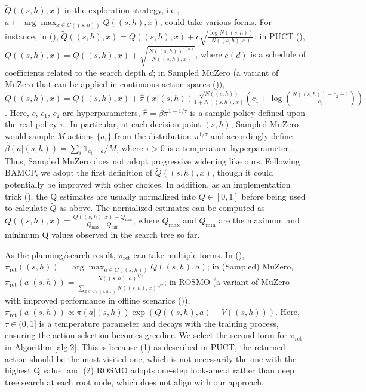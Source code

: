 $\tilde{Q}((s, h), x)$ in the exploration strategy, i.e., $a \leftarrow \arg \max_{x \in C((s, h))} \tilde{Q}((s, h), x)$, could take various forms. For instance, in (\cite{DBLP:conf/lion/CouetouxHSTB11, DBLP:journals/jair/GuezSD13, DBLP:conf/aaai/LeeJKK20}), $\tilde{Q}((s, h), x) = Q((s, h), x) + c \sqrt{\frac{\log N((s, h))}{N((s, h), x)}}$; in PUCT (\cite{DBLP:conf/pkdd/AugerCT13}), $\tilde{Q}((s, h), x) = Q((s, h), x) + \sqrt{\frac{N((s, h))^{e(d)}}{N((s, h), x)}}$, where $e(d)$ is a schedule of coefficients related to the search depth $d$; in Sampled MuZero (a variant of MuZero that can be applied in continuous action spaces (\cite{DBLP:conf/icml/HubertSABSS21})), $\tilde{Q}((s, h), x) = Q((s, h), x) + \hat{\pi}(x|(s, h)) \frac{\sqrt{N((s, h))}}{1+N((s, h), x)} \left(c_1 + \log \left(\frac{N((s,h))+c_2+1}{c_2}\right)\right)$.
Here, $c$, $c_1$, $c_2$ are hyperparameters, $\hat{\pi} = \hat{\beta} \pi^{1 - 1/\tau}$ is a sample policy defined upon the real policy $\pi$. In particular, at each decision point $(s, h)$, Sampled MuZero would sample $M$ actions $\{a_i\}$ from the distribution $\pi^{1/\tau}$ and accordingly define $\hat{\beta}(a|(s, h)) = \sum_{i} \mathds{1}_{a_i = a} / M$, where $\tau > 0$ is a temperature hyperparameter. Thus, Sampled MuZero does not adopt progressive widening like ours. Following BAMCP, we adopt the first definition of $\tilde{Q}((s, h), x)$, though it could potentially be improved with other choices. In addition, as an implementation trick (\cite{DBLP:conf/iclr/HamrickFBGVWABV21}), the Q estimates are usually normalized into $\bar{Q} \in [0, 1]$ before being used to calculate $\tilde{Q}$ as above. The normalized estimates can be computed as $\bar{Q}((s, h), x) = \frac{Q((s, h), x) - Q_{\text{min}}}{Q_{\text{max}} - Q_{\text{min}}}$, where $Q_{\text{max}}$ and $Q_{\text{min}}$ are the maximum and minimum Q values observed in the search tree so far.

As the planning/search result, $\pi_{\text{ret}}$ can take multiple forms. In (\cite{DBLP:journals/jair/GuezSD13, DBLP:conf/aips/SunbergK18, DBLP:conf/aaai/LeeJKK20}), $\pi_{\text{ret}}((s, h)) = \arg \max_{a \in C((s, h))} Q((s, h), a)$; in (Sampled) MuZero, $\pi_{\text{ret}}(a|(s, h)) = \frac{N((s, h), a)^{1/\tau}}{\sum_{x \in C((s, h))}N((s, h), x)^{1/\tau}}$; in ROSMO (a variant of MuZero with improved performance in offline scenarios (\cite{DBLP:conf/iclr/LiuLLYX23})), $\pi_{\text{ret}}(a|(s, h)) \propto \pi(a|(s, h)) \exp(Q((s, h), a) - V((s, h)))$. Here, $\tau \in (0, 1]$ is a temperature parameter and decays with the training process, ensuring the action selection becomes greedier. We select the second form for $\pi_{\text{ret}}$ in Algorithm \ref{alg:2}. This is because (1) as described in PUCT, the returned action should be the most visited one, which is not necessarily the one with the highest Q value, and (2) ROSMO adopts one-step look-ahead rather than deep tree search at each root node, which does not align with our approach.

